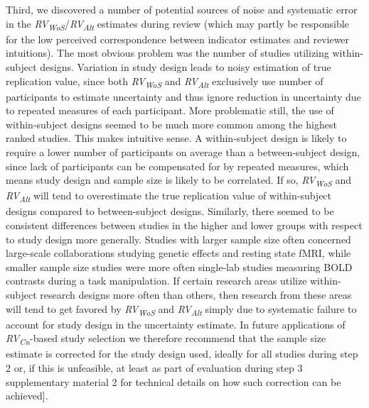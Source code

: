 \documentclass[
  man,floatsintext]{apa6}
\begin{document}
Third, we discovered a number of potential sources of noise and systematic error in the \emph{RV\textsubscript{WoS}}/\emph{RV\textsubscript{Alt}} estimates during review (which may partly be responsible for the low perceived correspondence between indicator estimates and reviewer intuitions). The most obvious problem was the number of studies utilizing within-subject designs. Variation in study design leads to noisy estimation of true replication value, since both \emph{RV\textsubscript{WoS}} and \emph{RV\textsubscript{Alt}} exclusively use number of participants to estimate uncertainty and thus ignore reduction in uncertainty due to repeated measures of each participant. More problematic still, the use of within-subject designs seemed to be much more common among the highest ranked studies. This makes intuitive sense. A within-subject design is likely to require a lower number of participants on average than a between-subject design, since lack of participants can be compensated for by repeated measures, which means study design and sample size is likely to be correlated. If so, \emph{RV\textsubscript{WoS}} and \emph{RV\textsubscript{Alt}} will tend to overestimate the true replication value of within-subject designs compared to between-subject designs. Similarly, there seemed to be consistent differences between studies in the higher and lower groups with respect to study design more generally. Studies with larger sample size often concerned large-scale collaborations studying genetic effects and resting state fMRI, while smaller sample size studies were more often single-lab studies measuring BOLD contrasts during a task manipulation. If certain research areas utilize within-subject research designs more often than others, then research from these areas will tend to get favored by \emph{RV\textsubscript{WoS}} and \emph{RV\textsubscript{Alt}} simply due to systematic failure to account for study design in the uncertainty estimate. In future applications of \emph{RV\textsubscript{Cn}}-based study selection we therefore recommend that the sample size estimate is corrected for the study design used, ideally for all studies during step 2 or, if this is unfeasible, at least as part of evaluation during step 3 supplementary material 2 for technical details on how such correction can be achieved{]}.
\end{document}

